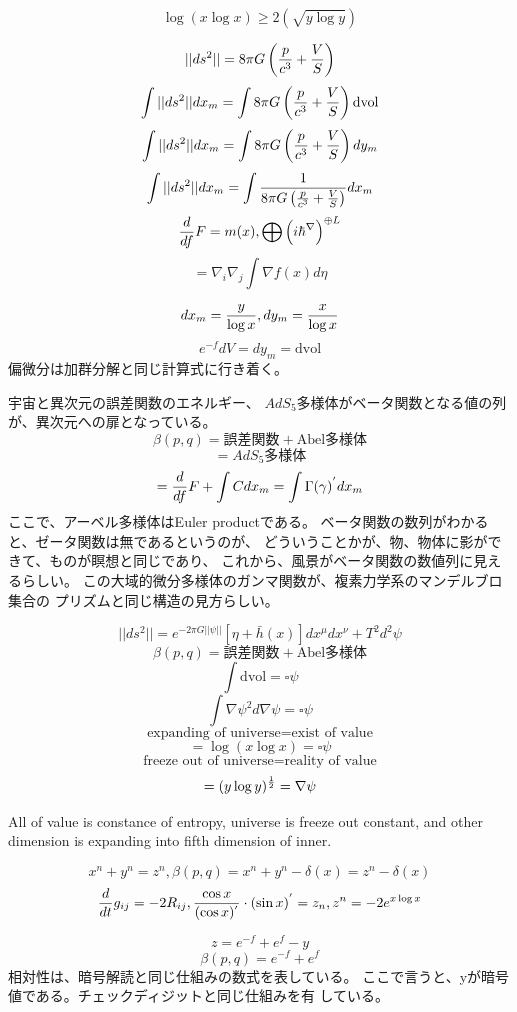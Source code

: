 \documentclass{jsarticle}
\begin{document}
  $$ \log (x \log x) \ge 2(\sqrt{y \log y}) $$

 
    $$ ||ds^2|| = 8 \pi G \left({p \over c^3} + {V \over S}\right) $$
    $$ \int ||ds^2||dx_m  = \int 8 \pi G \left({p \over c^3} 
    + {V \over S}\right)\mathrm{dvol}  $$
    $$ \int ||ds^2||dx_m  = \int 8 \pi G \left({p \over c^3} 
    + {V \over S}\right)dy_m $$
     $$ \int ||ds^2||dx_m  = \int {1 \over {8 \pi G \left({p \over c^3} 
    + {V \over S}\right)}}dx_m $$
    $$ {d \over df}F = m(x), \bigoplus \left({i \hbar}^{\nabla}\right)^{
	    \oplus L} $$
    $$ = \nabla_{i} \nabla_{j} \int \nabla f(x)d \eta $$

    $$ dx_m = {y \over {\log x}}, dy_m = {x \over \log x} $$
    $$ e^{-f}dV = dy_m = \mathrm{dvol} $$
    偏微分は加群分解と同じ計算式に行き着く。

   宇宙と異次元の誤差関数のエネルギー、
    $AdS_5$多様体がベータ関数となる値の列が、異次元への扉となっている。
    $$ \beta(p,q) = \text{誤差関数} + \text{Abel多様体} $$
    $$ = \text{$AdS_5$多様体} $$
    $$ = {d \over df}F + \int C dx_m = \int \Gamma(\gamma)^{'}dx_m $$
    ここで、アーベル多様体はEuler productである。
    ベータ関数の数列がわかると、ゼータ関数は無であるというのが、
    どういうことかが、物、物体に影ができて、ものが瞑想と同じであり、
    これから、風景がベータ関数の数値列に見えるらしい。
     この大域的微分多様体のガンマ関数が、複素力学系のマンデルブロ集合の
    プリズムと同じ構造の見方らしい。

    $$ ||ds^2|| = e^{-2\pi G ||\psi||}[\eta + \bar{h}(x)]dx^{\mu}dx^{\nu}
    + T^2 d^2 \psi $$
    $$ \beta(p,q) = \text{誤差関数} + \text{Abel多様体} $$
    $$ \int \mathrm{dvol} = \square \psi $$
    $$ \int \nabla \psi^2 d \nabla \psi = \square \psi $$
    $$ \text{expanding of universe} = \text{exist of value} $$
    $$ = \log (x \log x) = \square \psi $$
    $$ \text{freeze out of universe} = \text{reality of value} $$
    $$ = (y \log y)^{1 \over 2} = \nabla \psi $$

    All of value is constance of entropy, universe is freeze out
    constant, and other dimension is expanding into fifth dimension of
    inner.


      $$ x^n + y^n = z^n, \beta(p,q) = x^n + y^n - \delta(x) = z^n - \delta
      (x) $$
      $$ {d \over dt}g_{ij} = - 2 R_{ij}, {\cos x \over (\cos x)^{'}}
      \cdot (\sin x)^{'} = z_n, z^n = - 2 e^{x \log x} $$

      $$ z = e^{-f} + e^{f} - y $$
      $$ \beta(p,q) = e^{-f} + e^{f} $$
      相対性は、暗号解読と同じ仕組みの数式を表している。
      ここで言うと、yが暗号値である。チェックディジットと同じ仕組みを有
      している。
\end{document}
